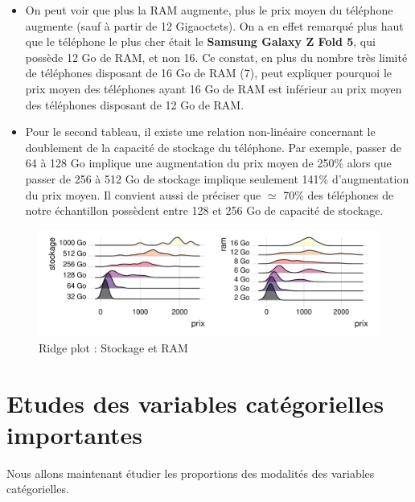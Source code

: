 \documentclass[
  12pt,
]{report}
\begin{document}
\begin{itemize}
\item
  On peut voir que plus la RAM augmente, plus le prix moyen du téléphone
  augmente (sauf à partir de 12 Gigaoctets). On a en effet remarqué plus
  haut que le téléphone le plus cher était le \textbf{Samsung Galaxy Z
  Fold 5}, qui possède 12 Go de RAM, et non 16. Ce constat, en plus du
  nombre très limité de téléphones disposant de 16 Go de RAM (7), peut
  expliquer pourquoi le prix moyen des téléphones ayant 16 Go de RAM est
  inférieur au prix moyen des téléphones disposant de 12 Go de RAM.
\item
  Pour le second tableau, il existe une relation non-linéaire concernant
  le doublement de la capacité de stockage du téléphone. Par exemple,
  passer de 64 à 128 Go implique une augmentation du prix moyen de 250\%
  alors que passer de 256 à 512 Go de stockage implique seulement 141\%
  d'augmentation du prix moyen. Il convient aussi de préciser que
  \(\simeq\) 70\% des téléphones de notre échantillon possèdent entre
  128 et 256 Go de capacité de stockage.
\end{itemize}

\begin{figure}[H]

{\centering \includegraphics{report_files/figure-pdf/ggplots-1.pdf}

}

\caption{Ridge plot : Stockage et RAM}

\end{figure}%

\newpage

\section{Etudes des variables catégorielles
importantes}\label{etudes-des-variables-catuxe9gorielles-importantes}

Nous allons maintenant étudier les proportions des modalités des
variables catégorielles.
\end{document}
